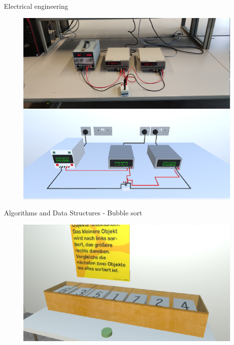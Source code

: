 \documentclass[final,hyperref={pdfpagelabels=false}]{beamer}
\begin{document}
\begin{frame}[t]
\begin{columns}[t]
\begin{column}{.465\textwidth} %

\begin{block}{Electrical engineering}
	
	\begin{figure}
		\centering
		\includegraphics[width=0.95\linewidth]{etechnik_vgl}

	\end{figure}
	\vspace{20px}
\end{block}

\vspace{0.3cm}

\begin{block}{Algorithms and Data Structures - Bubble sort}
	\begin{figure}
		\centering
		\includegraphics[width=0.95\linewidth]{informatiklab_bubblesort}


\end{figure}
\end{block}
\end{column}
\end{columns}
\end{frame}
\end{document}
